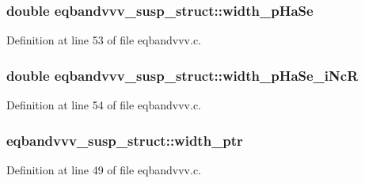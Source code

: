 \subsubsection[{\texorpdfstring{width\+\_\+p\+Ha\+Se}{width_pHaSe}}]{\setlength{\rightskip}{0pt plus 5cm}double eqbandvvv\+\_\+susp\+\_\+struct\+::width\+\_\+p\+Ha\+Se}\hypertarget{structeqbandvvv__susp__struct_a208e02d695d7f6f83a9df47f2970b98c}{}\label{structeqbandvvv__susp__struct_a208e02d695d7f6f83a9df47f2970b98c}


Definition at line 53 of file eqbandvvv.\+c.

\subsubsection[{\texorpdfstring{width\+\_\+p\+Ha\+Se\+\_\+i\+NcR}{width_pHaSe_iNcR}}]{\setlength{\rightskip}{0pt plus 5cm}double eqbandvvv\+\_\+susp\+\_\+struct\+::width\+\_\+p\+Ha\+Se\+\_\+i\+NcR}\hypertarget{structeqbandvvv__susp__struct_a493390b9a79657ab34ba363525a202fb}{}\label{structeqbandvvv__susp__struct_a493390b9a79657ab34ba363525a202fb}


Definition at line 54 of file eqbandvvv.\+c.

\subsubsection[{\texorpdfstring{width\+\_\+ptr}{width_ptr}}]{ eqbandvvv\+\_\+susp\+\_\+struct\+::width\+\_\+ptr}\hypertarget{structeqbandvvv__susp__struct_a2bbbca8fc89520121de9c239ef7df1c2}{}\label{structeqbandvvv__susp__struct_a2bbbca8fc89520121de9c239ef7df1c2}


Definition at line 49 of file eqbandvvv.\+c.

